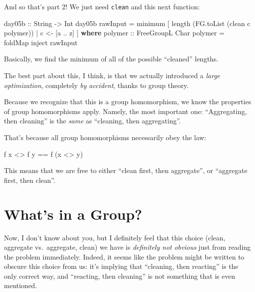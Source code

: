 \documentclass[]{article}
\newenvironment{Shaded}{}{}
\newcommand{\CharTok}[1]{\textcolor[rgb]{0.25,0.44,0.63}{#1}}
\newcommand{\DataTypeTok}[1]{\textcolor[rgb]{0.56,0.13,0.00}{#1}}
\newcommand{\FunctionTok}[1]{\textcolor[rgb]{0.02,0.16,0.49}{#1}}
\newcommand{\KeywordTok}[1]{\textcolor[rgb]{0.00,0.44,0.13}{\textbf{#1}}}
\newcommand{\NormalTok}[1]{#1}
\newcommand{\OperatorTok}[1]{\textcolor[rgb]{0.40,0.40,0.40}{#1}}
\newcommand{\OtherTok}[1]{\textcolor[rgb]{0.00,0.44,0.13}{#1}}
\begin{document}
And so that's part 2! We just need \texttt{clean} and this next function:

\begin{Shaded}
\begin{Highlighting}[]
\OtherTok{day05b ::} \DataTypeTok{String} \OtherTok{{-}\textgreater{}} \DataTypeTok{Int}
\NormalTok{day05b rawInput }\OtherTok{=} \FunctionTok{minimum}
\NormalTok{    [ }\FunctionTok{length}\NormalTok{ (FG.toList (clean c polymer))}
    \OperatorTok{|}\NormalTok{ c }\OtherTok{\textless{}{-}}\NormalTok{ [}\CharTok{\textquotesingle{}a\textquotesingle{}} \OperatorTok{..} \CharTok{\textquotesingle{}z\textquotesingle{}}\NormalTok{]}
\NormalTok{    ]}
  \KeywordTok{where}
\OtherTok{    polymer ::} \DataTypeTok{FreeGroupL} \DataTypeTok{Char}
\NormalTok{    polymer }\OtherTok{=} \FunctionTok{foldMap}\NormalTok{ inject rawInput}
\end{Highlighting}
\end{Shaded}

Basically, we find the minimum of all of the possible ``cleaned'' lengths.

The best part about this, I think, is that we actually introduced a \emph{large
optimization}, completely \emph{by accident}, thanks to group theory.

Because we recognize that this is a group homomorphism, we know the properties
of group homomorphisms apply. Namely, the most important one: ``Aggregating,
then cleaning'' is the \emph{same} as ``cleaning, then aggregating''.

That's because all group homomorphisms necessarily obey the law:

\begin{Shaded}
\begin{Highlighting}[]
\NormalTok{f x }\OperatorTok{\textless{}\textgreater{}}\NormalTok{ f y }\OperatorTok{==}\NormalTok{ f (x }\OperatorTok{\textless{}\textgreater{}}\NormalTok{ y)}
\end{Highlighting}
\end{Shaded}

This means that we are free to either ``clean first, then aggregate'', or
``aggregate first, then clean''.

\section{What's in a Group?}\label{whats-in-a-group}

Now, I don't know about you, but I definitely feel that this choice (clean,
aggregate vs.~aggregate, clean) we have is \emph{definitely not obvious} just
from reading the problem immediately. Indeed, it seems like the problem might be
written to obscure this choice from us: it's implying that ``cleaning, then
reacting'' is the only correct way, and ``reacting, then cleaning'' is not
something that is even mentioned.
\end{document}
